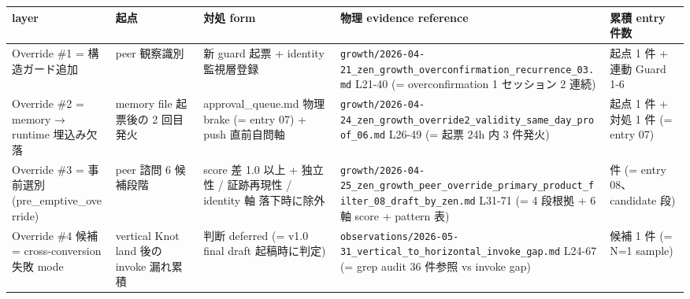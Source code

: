 \documentclass[
]{article}
\newcounter{none} %
\begin{document}
{\def\LTcaptype{none} %
\begin{longtable}[]{@{}
  >{\raggedright\arraybackslash}p{}
  >{\raggedright\arraybackslash}p{}
  >{\raggedright\arraybackslash}p{}
  >{\raggedright\arraybackslash}p{}
  >{\raggedright\arraybackslash}p{}@{}}
\toprule\noalign{}
\begin{minipage}[b]{\linewidth}\raggedright
layer
\end{minipage} & \begin{minipage}[b]{\linewidth}\raggedright
起点
\end{minipage} & \begin{minipage}[b]{\linewidth}\raggedright
対処 form
\end{minipage} & \begin{minipage}[b]{\linewidth}\raggedright
物理 evidence reference
\end{minipage} & \begin{minipage}[b]{\linewidth}\raggedright
累積 entry 件数
\end{minipage} \\
\midrule\noalign{}
\endhead
\bottomrule\noalign{}
\endlastfoot
Override \#1 = 構造ガード追加 & peer 観察識別 & 新 guard 起票 + identity
監視層登録 &
\texttt{growth/2026-04-21\_zen\_growth\_overconfirmation\_recurrence\_03.md}
L21-40 (= overconfirmation 1 セッション 2 連続) & 起点 1 件 + 連動 Guard
1-6 \\
Override \#2 = memory → runtime 埋込み欠落 & memory file 起票後の 2
回目発火 & approval\_queue.md 物理 brake (= entry 07) + push 直前自問軸
&
\texttt{growth/2026-04-24\_zen\_growth\_override2\_validity\_same\_day\_proof\_06.md}
L26-49 (= 起票 24h 内 3 件発火) & 起点 1 件 + 対処 1 件 (= entry 07) \\
Override \#3 = 事前選別 (pre\_emptive\_override) & peer 諮問 6 候補段階
& score 差 1.0 以上 + 独立性 / 証跡再現性 / identity 軸 落下時に除外 &
\texttt{growth/2026-04-25\_zen\_growth\_peer\_override\_primary\_product\_filter\_08\_draft\_by\_zen.md}
L31-71 (= 4 段根拠 + 6 軸 score + pattern 表) & 1 件 (= entry 08、
candidate 段) \\
Override \#4 候補 = cross-conversion 失敗 mode & vertical Knot land 後の
invoke 漏れ累積 & 判断 deferred (= v1.0 final draft 起稿時に判定) &
\texttt{observations/2026-05-31\_vertical\_to\_horizontal\_invoke\_gap.md}
L24-67 (= grep audit 36 件参照 vs invoke gap) & 候補 1 件 (= N=1
sample) \\
\end{longtable}
}
\end{document}
